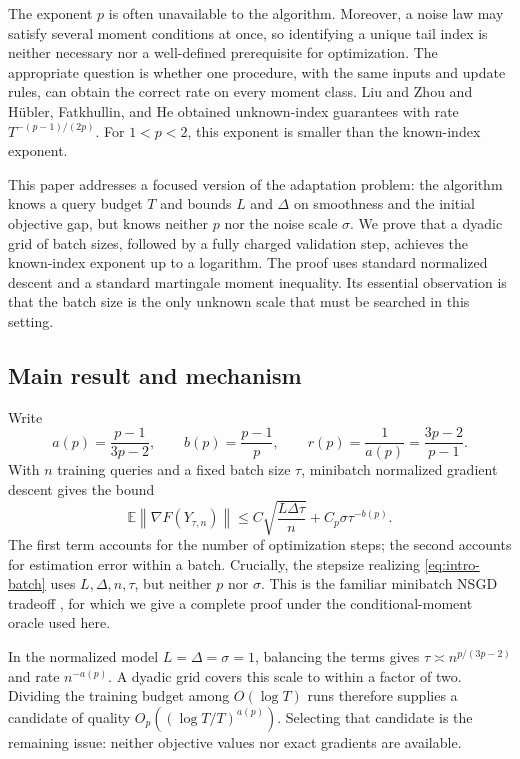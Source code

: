 \documentclass[11pt,a4paper]{article}
\newcommand{\E}{\mathbb{E}}
\newcommand{\norm}[1]{\left\lVert #1\right\rVert}
\theoremstyle{definition}
\theoremstyle{remark}
\begin{document}
The exponent $p$ is often unavailable to the algorithm. Moreover, a noise law
may satisfy several moment conditions at once, so identifying a unique tail
index is neither necessary nor a well-defined prerequisite for optimization.
The appropriate question is whether one procedure, with the same inputs and
update rules, can obtain the correct rate on every moment class.
Liu and Zhou \cite{liuzhou2025} and H\"ubler, Fatkhullin, and He
\cite{hubler2025normalization} obtained unknown-index guarantees with rate
$T^{-(p-1)/(2p)}$. For $1<p<2$, this exponent is smaller than the
known-index exponent.

This paper addresses a focused version of the adaptation problem: the
algorithm knows a query budget $T$ and bounds $L$ and $\Delta$ on smoothness
and the initial objective gap, but knows neither $p$ nor the noise scale
$\sigma$. We prove that a dyadic grid of batch sizes, followed by a fully
charged validation step, achieves the known-index exponent up to a logarithm.
The proof uses standard normalized descent and a standard martingale moment
inequality. Its essential observation is that the batch size is the only
unknown scale that must be searched in this setting.

\subsection{Main result and mechanism}

Write
\begin{equation}\label{eq:exponents-intro}
 a(p)=\frac{p-1}{3p-2},\qquad
 b(p)=\frac{p-1}{p},\qquad
 r(p)=\frac{1}{a(p)}=\frac{3p-2}{p-1}.
\end{equation}
With $n$ training queries and a fixed batch size $\tau$, minibatch normalized
gradient descent gives the bound
\begin{equation}\label{eq:intro-batch}
 \E\norm{\nabla F(Y_{\tau,n})}
 \le C\sqrt{\frac{L\Delta\tau}{n}}
       +C_p\sigma\tau^{-b(p)}.
\end{equation}
The first term accounts for the number of optimization steps; the second
accounts for estimation error within a batch. Crucially, the stepsize
realizing \eqref{eq:intro-batch} uses $L,\Delta,n,\tau$, but neither
$p$ nor $\sigma$. This is the familiar minibatch NSGD tradeoff
\cite{hubler2025normalization}, for which we give a complete proof under
the conditional-moment oracle used here.

In the normalized model $L=\Delta=\sigma=1$, balancing the terms gives
$\tau\asymp n^{p/(3p-2)}$ and rate $n^{-a(p)}$.
A dyadic grid covers this scale to within a factor of two. Dividing the
training budget among $O(\log T)$ runs therefore supplies a candidate of
quality $O_p((\log T/T)^{a(p)})$.
Selecting that candidate is the remaining issue: neither objective values
nor exact gradients are available.
\end{document}
